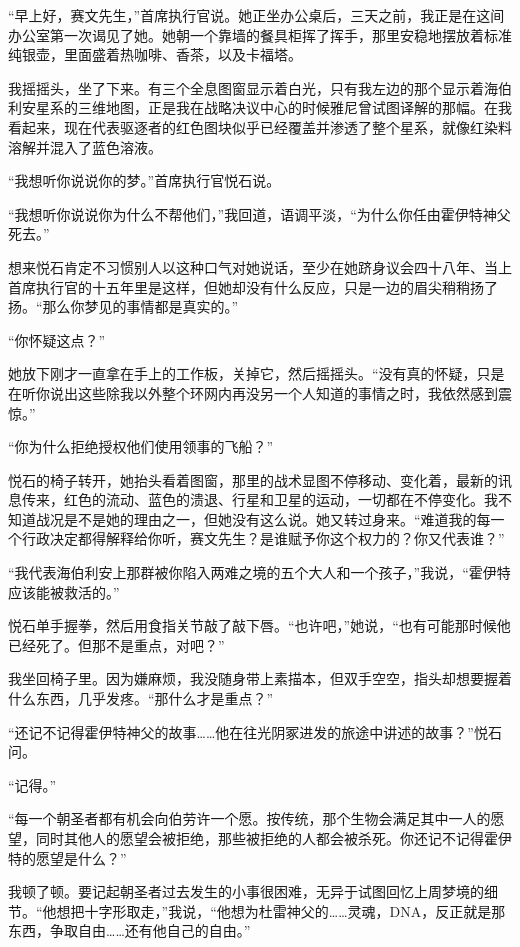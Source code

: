\documentclass[AutoFakeBold=true]{book}
\begin{document}
``早上好，赛文先生，''首席执行官说。她正坐办公桌后，三天之前，我正是在这间办公室第一次谒见了她。她朝一个靠墙的餐具柜挥了挥手，那里安稳地摆放着标准纯银壶，里面盛着热咖啡、香茶，以及卡福塔。

我摇摇头，坐了下来。有三个全息图窗显示着白光，只有我左边的那个显示着海伯利安星系的三维地图，正是我在战略决议中心的时候雅尼曾试图译解的那幅。在我看起来，现在代表驱逐者的红色图块似乎已经覆盖并渗透了整个星系，就像红染料溶解并混入了蓝色溶液。

``我想听你说说你的梦。''首席执行官悦石说。

``我想听你说说你为什么不帮他们，''我回道，语调平淡，``为什么你任由霍伊特神父死去。''

想来悦石肯定不习惯别人以这种口气对她说话，至少在她跻身议会四十八年、当上首席执行官的十五年里是这样，但她却没有什么反应，只是一边的眉尖稍稍扬了扬。``那么你梦见的事情都是真实的。''

``你怀疑这点？''

她放下刚才一直拿在手上的工作板，关掉它，然后摇摇头。``没有真的怀疑，只是在听你说出这些除我以外整个环网内再没另一个人知道的事情之时，我依然感到震惊。''

``你为什么拒绝授权他们使用领事的飞船？''

悦石的椅子转开，她抬头看着图窗，那里的战术显图不停移动、变化着，最新的讯息传来，红色的流动、蓝色的溃退、行星和卫星的运动，一切都在不停变化。我不知道战况是不是她的理由之一，但她没有这么说。她又转过身来。``难道我的每一个行政决定都得解释给你听，赛文先生？是谁赋予你这个权力的？你又代表谁？''

``我代表海伯利安上那群被你陷入两难之境的五个大人和一个孩子，''我说，``霍伊特应该能被救活的。''

悦石单手握拳，然后用食指关节敲了敲下唇。``也许吧，''她说，``也有可能那时候他已经死了。但那不是重点，对吧？''

我坐回椅子里。因为嫌麻烦，我没随身带上素描本，但双手空空，指头却想要握着什么东西，几乎发疼。``那什么才是重点？''

``还记不记得霍伊特神父的故事……他在往光阴冢进发的旅途中讲述的故事？''悦石问。

``记得。''

``每一个朝圣者都有机会向伯劳许一个愿。按传统，那个生物会满足其中一人的愿望，同时其他人的愿望会被拒绝，那些被拒绝的人都会被杀死。你还记不记得霍伊特的愿望是什么？''

我顿了顿。要记起朝圣者过去发生的小事很困难，无异于试图回忆上周梦境的细节。``他想把十字形取走，''我说，``他想为杜雷神父的……灵魂，DNA，反正就是那东西，争取自由……还有他自己的自由。''
\end{document}
